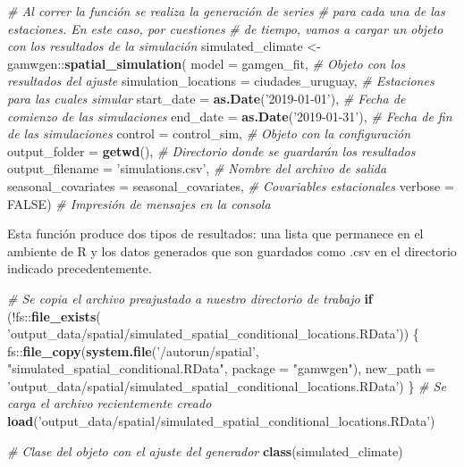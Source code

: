 \documentclass[
  12pt]{article}
\newenvironment{Shaded}{}{}
\newcommand{\CommentTok}[1]{\textcolor[rgb]{0.38,0.63,0.69}{\textit{#1}}}
\newcommand{\ControlFlowTok}[1]{\textcolor[rgb]{0.00,0.44,0.13}{\textbf{#1}}}
\newcommand{\DataTypeTok}[1]{\textcolor[rgb]{0.56,0.13,0.00}{#1}}
\newcommand{\KeywordTok}[1]{\textcolor[rgb]{0.00,0.44,0.13}{\textbf{#1}}}
\newcommand{\NormalTok}[1]{#1}
\newcommand{\OperatorTok}[1]{\textcolor[rgb]{0.40,0.40,0.40}{#1}}
\newcommand{\OtherTok}[1]{\textcolor[rgb]{0.00,0.44,0.13}{#1}}
\newcommand{\StringTok}[1]{\textcolor[rgb]{0.25,0.44,0.63}{#1}}
\begin{document}
\begin{Shaded}
\begin{Highlighting}[]
\CommentTok{# Al correr la función se realiza la generación de series }
\CommentTok{# para cada una de las estaciones. En este caso, por cuestiones }
\CommentTok{# de tiempo, vamos a cargar un objeto con los resultados de la simulación }
\NormalTok{simulated_climate <-}\StringTok{ }\NormalTok{gamwgen}\OperatorTok{::}\KeywordTok{spatial_simulation}\NormalTok{(}
  \DataTypeTok{model =}\NormalTok{ gamgen_fit, }
  \CommentTok{# Objeto con los resultados del ajuste}
  \DataTypeTok{simulation_locations =}\NormalTok{ ciudades_uruguay, }
  \CommentTok{# Estaciones para las cuales simular}
  \DataTypeTok{start_date =} \KeywordTok{as.Date}\NormalTok{(}\StringTok{'2019-01-01'}\NormalTok{), }
  \CommentTok{# Fecha de comienzo de las simulaciones}
  \DataTypeTok{end_date =} \KeywordTok{as.Date}\NormalTok{(}\StringTok{'2019-01-31'}\NormalTok{),}
  \CommentTok{# Fecha de fin de las simulaciones}
  \DataTypeTok{control =}\NormalTok{ control_sim, }
  \CommentTok{# Objeto con la configuración}
  \DataTypeTok{output_folder =} \KeywordTok{getwd}\NormalTok{(), }
  \CommentTok{# Directorio donde se guardarán los resultados}
  \DataTypeTok{output_filename =} \StringTok{'simulations.csv'}\NormalTok{, }
  \CommentTok{# Nombre del archivo de salida}
  \DataTypeTok{seasonal_covariates =}\NormalTok{ seasonal_covariates, }
  \CommentTok{# Covariables estacionales}
  \DataTypeTok{verbose =} \OtherTok{FALSE}\NormalTok{) }
\CommentTok{# Impresión de mensajes en la consola}
\end{Highlighting}
\end{Shaded}

Esta función produce dos tipos de resultados: una lista que permanece en el ambiente de R y los datos generados que son guardados como .csv en el directorio indicado precedentemente.

\begin{Shaded}
\begin{Highlighting}[]
\CommentTok{# Se copia el archivo preajustado a nuestro directorio de trabajo}
\ControlFlowTok{if}\NormalTok{ (}\OperatorTok{!}\NormalTok{fs}\OperatorTok{::}\KeywordTok{file_exists}\NormalTok{(}
  \StringTok{'output_data/spatial/simulated_spatial_conditional_locations.RData'}\NormalTok{)) \{}
\NormalTok{  fs}\OperatorTok{::}\KeywordTok{file_copy}\NormalTok{(}\KeywordTok{system.file}\NormalTok{(}\StringTok{'/autorun/spatial'}\NormalTok{, }\StringTok{"simulated_spatial_conditional.RData"}\NormalTok{,  }
                            \DataTypeTok{package =} \StringTok{"gamwgen"}\NormalTok{),}
        \DataTypeTok{new_path =} 
          \StringTok{'output_data/spatial/simulated_spatial_conditional_locations.RData'}\NormalTok{)}
\NormalTok{\}  }
\CommentTok{# Se carga el archivo recientemente creado}
\KeywordTok{load}\NormalTok{(}\StringTok{'output_data/spatial/simulated_spatial_conditional_locations.RData'}\NormalTok{)}

\CommentTok{# Clase del objeto con el ajuste del generador}
\KeywordTok{class}\NormalTok{(simulated_climate)}
\end{Highlighting}
\end{Shaded}
\end{document}
